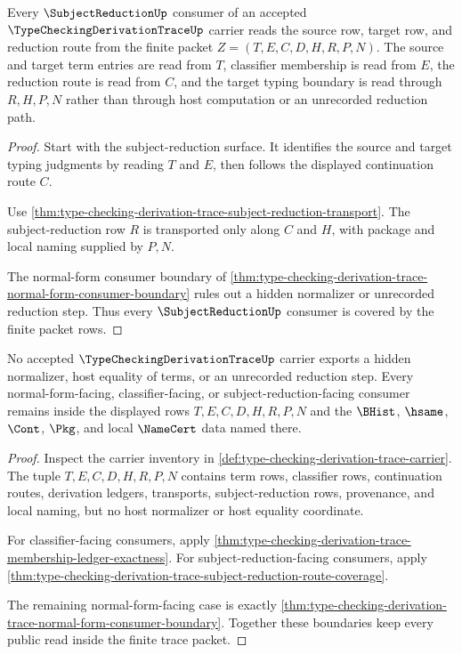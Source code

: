 \begin{theorem}
\label{thm:type-checking-derivation-trace-subject-reduction-route-coverage}
Every $\SubjectReductionUp$ consumer of an accepted $\TypeCheckingDerivationTraceUp$ carrier reads the source row, target row, and reduction route from the finite packet $Z=(T,E,C,D,H,R,P,N)$. The source and target term entries are read from $T$, classifier membership is read from $E$, the reduction route is read from $C$, and the target typing boundary is read through $R,H,P,N$ rather than through host computation or an unrecorded reduction path.
\end{theorem}
\begin{proof}
Start with the subject-reduction surface. It identifies the source and target typing judgments by reading $T$ and $E$, then follows the displayed continuation route $C$.

Use \autoref{thm:type-checking-derivation-trace-subject-reduction-transport}. The subject-reduction row $R$ is transported only along $C$ and $H$, with package and local naming supplied by $P,N$.

The normal-form consumer boundary of \autoref{thm:type-checking-derivation-trace-normal-form-consumer-boundary} rules out a hidden normalizer or unrecorded reduction step. Thus every $\SubjectReductionUp$ consumer is covered by the finite packet rows.
\end{proof}

\begin{theorem}
\label{thm:type-checking-derivation-trace-host-normalizer-nonescape}
No accepted $\TypeCheckingDerivationTraceUp$ carrier exports a hidden normalizer, host equality of terms, or an unrecorded reduction step. Every normal-form-facing, classifier-facing, or subject-reduction-facing consumer remains inside the displayed rows $T,E,C,D,H,R,P,N$ and the $\BHist$, $\hsame$, $\Cont$, $\Pkg$, and local $\NameCert$ data named there.
\end{theorem}
\begin{proof}
Inspect the carrier inventory in \autoref{def:type-checking-derivation-trace-carrier}. The tuple $T,E,C,D,H,R,P,N$ contains term rows, classifier rows, continuation routes, derivation ledgers, transports, subject-reduction rows, provenance, and local naming, but no host normalizer or host equality coordinate.

For classifier-facing consumers, apply \autoref{thm:type-checking-derivation-trace-membership-ledger-exactness}. For subject-reduction-facing consumers, apply \autoref{thm:type-checking-derivation-trace-subject-reduction-route-coverage}.

The remaining normal-form-facing case is exactly \autoref{thm:type-checking-derivation-trace-normal-form-consumer-boundary}. Together these boundaries keep every public read inside the finite trace packet.
\end{proof}

